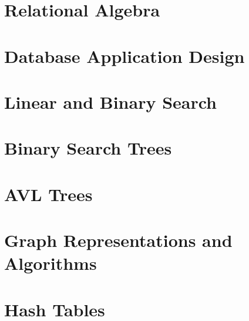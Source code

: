 \documentclass[
  11pt,
  a4paper,
]{article}
\begin{document}
\section{Relational Algebra}


\section{Database Application Design}


\section{Linear and Binary Search}


\section{Binary Search Trees}


\section{AVL Trees}


\section{Graph Representations and Algorithms}


\section{Hash Tables}

\end{document}
